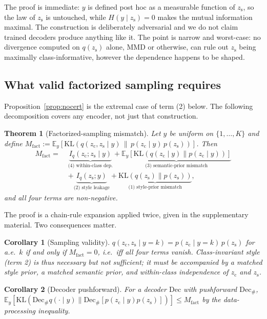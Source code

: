 \documentclass[letterpaper]{article} %
\newtheorem{theorem}{Theorem}
\newtheorem{corollary}{Corollary}
\newcommand{\zc}{z_{\mathrm{c}}}
\newcommand{\zs}{z_{\mathrm{s}}}
\newcommand{\KL}{\mathrm{KL}}
\begin{document}
The proof is immediate: $y$ is defined post hoc as a measurable function of
$\zs$, so the law of $\zs$ is untouched, while $H(y\mid\zs)=0$ makes the
mutual information maximal. The construction is deliberately adversarial and
we do not claim trained decoders produce anything like it. The point is
narrow and worst-case: no divergence computed on $q(\zs)$ alone, MMD or
otherwise, can rule out $\zs$ being maximally class-informative, however the
dependence happens to be shaped.

\subsection{What valid factorized sampling requires}

Proposition~\ref{prop:nocert} is the extremal case of term (2) below. The
following decomposition covers any encoder, not just that construction.

\begin{theorem}[Factorized-sampling mismatch]
\label{thm:decomp}
Let $y$ be uniform on $\{1,\dots,K\}$ and define
$M_{\mathrm{fact}} := \mathbb E_y[\KL(q(\zc,\zs\mid y)\,\|\,p(\zc\mid
y)\,p(\zs))]$. Then
\begin{align*}
M_{\mathrm{fact}} =\;& \underbrace{I_q(\zc;\zs\mid y)}_{\text{(4) within-class dep.}}
 + \underbrace{\mathbb E_y[\KL(q(\zc\mid y)\|p(\zc\mid y))]}_{\text{(3) semantic-prior mismatch}}\\
 &+ \underbrace{I_q(\zs;y)}_{\text{(2) style leakage}}
 + \underbrace{\KL(q(\zs)\|p(\zs))}_{\text{(1) style-prior mismatch}},
\end{align*}
and all four terms are non-negative.
\end{theorem}

The proof is a chain-rule expansion applied twice, given in the
supplementary material. Two consequences matter.

\begin{corollary}[Sampling validity]
\label{cor:valid}
$q(\zc,\zs\mid y{=}k)=p(\zc\mid y{=}k)\,p(\zs)$ for a.e.\ $k$ if and only if
$M_{\mathrm{fact}}=0$, i.e.\ iff all four terms vanish. Class-invariant style
(term 2) is thus necessary but not sufficient; it must be accompanied by a
matched style prior, a matched semantic prior, and within-class independence
of $\zc$ and $\zs$.
\end{corollary}

\begin{corollary}[Decoder pushforward]
\label{cor:push}
For a decoder $\mathrm{Dec}$ with pushforward $\mathrm{Dec}_\#$,
$\mathbb E_y[\KL(\mathrm{Dec}_\# q(\cdot\mid y)\|\mathrm{Dec}_\#[p(\zc\mid
y)p(\zs)])] \le M_{\mathrm{fact}}$ by the data-processing inequality.
\end{corollary}
\end{document}
